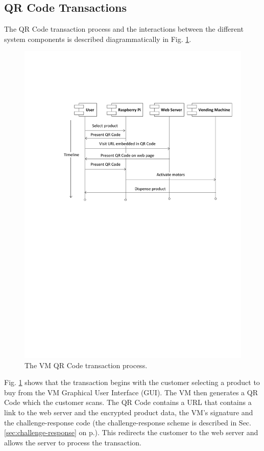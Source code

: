 \subsection{QR Code Transactions}

The QR Code transaction process and the interactions between the different
system components is described diagrammatically in Fig.
\ref{fig:vm_prog_interaction}.

\begin{figure}
 \centering 
 \includegraphics[clip=true, trim = 60 430 0 140, scale=0.7]{qrcode_processflow_user}
 \caption{The VM QR Code transaction process.}
 \label{fig:vm_prog_interaction}
\end{figure}

Fig. \ref{fig:vm_prog_interaction} shows that the transaction begins with
the customer selecting a product to buy from the VM Graphical User
Interface (GUI). The VM then generates a QR Code which the customer scans. The QR Code
contains a URL that contains a link to the web server and the encrypted product data, the
VM's signature and the challenge-response code (the challenge-response scheme is
described in Sec. \ref{sec:challenge-response} on p.\pageref{sec:challenge-response}).
This redirects the customer to the web server and allows the server to process the
transaction.


